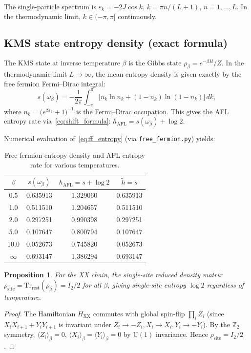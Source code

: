 \documentclass[12pt,a4paper]{article}
\newtheorem{proposition}[theorem]{Proposition}
\begin{document}
The single-particle spectrum is $\varepsilon_k = -2J \cos k$, $k = \pi n/(L+1)$,
$n = 1, \dots, L$.  In the thermodynamic limit, $k \in (-\pi, \pi]$ continuously.

\subsection{KMS state entropy density (exact formula)}

The KMS state at inverse temperature $\beta$ is the Gibbs state
$\rho_\beta = e^{-\beta H}/Z$.  In the thermodynamic limit $L \to \infty$, the mean
entropy density is given exactly by the free fermion Fermi--Dirac integral:
\begin{equation}
  s(\omega_\beta) = -\frac{1}{2\pi} \int_{-\pi}^{\pi}
    \bigl[n_k \ln n_k + (1-n_k)\ln(1-n_k)\bigr]\, dk,
  \label{eq:ff_entropy}
\end{equation}
where $n_k = \bigl(e^{\beta \varepsilon_k} + 1\bigr)^{-1}$ is the Fermi--Dirac
occupation.  This gives the AFL entropy rate via~\eqref{eq:shift_formula}:
$h_{\mathrm{AFL}} = s(\omega_\beta) + \log 2$.

Numerical evaluation of~\eqref{eq:ff_entropy} (via \texttt{free\_fermion.py}) yields:

\begin{table}[h]
\centering
\caption{Free fermion entropy density and AFL entropy rate for various temperatures.}
\label{tab:ff_entropy}
\begin{tabular}{cccc}
\hline
$\beta$ & $s(\omega_\beta)$ & $h_{\mathrm{AFL}} = s+\log 2$ & $\widetilde{h} = s$ \\
\hline
0.5  & 0.635913 & 1.329060 & 0.635913 \\
1.0  & 0.511510 & 1.204657 & 0.511510 \\
2.0  & 0.297251 & 0.990398 & 0.297251 \\
5.0  & 0.107647 & 0.800794 & 0.107647 \\
10.0 & 0.052673 & 0.745820 & 0.052673 \\
$\infty$ & 0.693147 & 1.386294 & 0.693147 \\
\hline
\end{tabular}
\end{table}

\begin{proposition}
  For the XX chain, the single-site reduced density matrix $\rho_{\mathrm{site}} =
  \mathrm{Tr}_{\mathrm{rest}}(\rho_\beta) = I_2/2$ for \emph{all} $\beta$, giving
  single-site entropy $\log 2$ regardless of temperature.
\end{proposition}
\begin{proof}
  The Hamiltonian $H_{\mathrm{XX}}$ commutes with global spin-flip $\prod_i Z_i$ (since
  $X_i X_{i+1} + Y_i Y_{i+1}$ is invariant under $Z_i \to -Z_i, X_i \to X_i, Y_i \to
  -Y_i$).  By the $\mathbb{Z}_2$ symmetry, $\langle Z_i \rangle_\beta = 0$, $\langle
  X_i \rangle_\beta = \langle Y_i \rangle_\beta = 0$ by $\mathrm{U}(1)$ invariance.
  Hence $\rho_{\mathrm{site}} = I_2/2$.
\end{proof}
\end{document}
